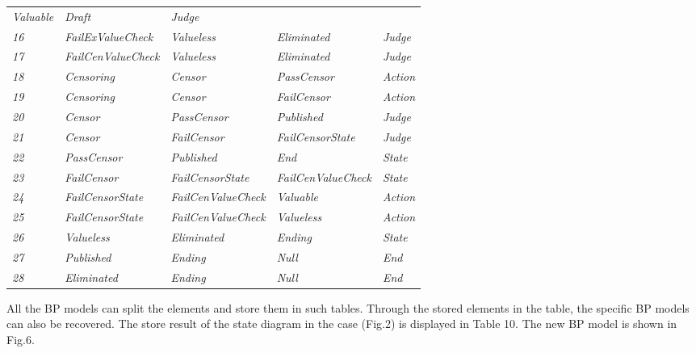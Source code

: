 \documentclass{elsarticle}
\begin{document}
\begin{table}[!ht]
\begin{supertabular}{m{0.6in}m{1.1052598in}m{1.1in}m{1in}m{0.4in}}
\itshape\color{black} Valuable &
\itshape\color{black} Draft &
\itshape\color{black} Judge\\
\centering \itshape 16 &
\itshape\color{black} FailExValueCheck &
\itshape\color{black} Valueless &
\itshape\color{black} Eliminated &
\itshape\color{black} Judge\\
\centering \itshape 17 &
\itshape\color{black} FailCenValueCheck &
\itshape\color{black} Valueless &
\itshape\color{black} Eliminated &
\itshape\color{black} Judge\\
\centering \itshape 18 &
\itshape Censoring &
\itshape Censor &
\itshape PassCensor &
\itshape Action\\
\centering \itshape 19 &
\itshape Censoring &
\itshape Censor &
\itshape FailCensor &
\itshape Action\\
\centering \itshape 20 &
\itshape Censor &
\itshape PassCensor &
\itshape Published &
\itshape Judge\\
\centering \itshape 21 &
\itshape Censor &
\itshape FailCensor &
\itshape FailCensorState &
\itshape Judge\\
\centering \itshape 22 &
\itshape PassCensor &
\itshape Published &
\itshape End &
\itshape State\\
\centering \itshape 23 &
\itshape FailCensor &
\itshape FailCensorState &
\itshape FailCenValueCheck &
\itshape State\\
\centering \itshape 24 &
\itshape FailCensorState &
\itshape FailCenValueCheck &
\itshape Valuable &
\itshape Action\\
\centering \itshape 25 &
\itshape FailCensorState &
\itshape FailCenValueCheck &
\itshape Valueless &
\itshape Action\\
\centering \itshape 26 &
\itshape Valueless &
\itshape Eliminated &
\itshape Ending &
\itshape State\\
\centering \itshape 27 &
\itshape Published &
\itshape Ending &
\sffamily
\textrm{\textit{Null}}\textrm{\textcolor{black}{ }} &
\itshape End\\
\centering \itshape 28 &
\itshape Eliminated &
\itshape Ending &
\itshape Null &
\itshape End\\\hline
\end{supertabular}
\end{table}


 All the BP models can split the elements and
store them in such tables. Through the stored
elements in the table, the specific BP models can also be recovered. The
store result of the state diagram in the case (Fig.2) is displayed in
Table 10. The new BP model is shown in Fig.6.
\end{document}
